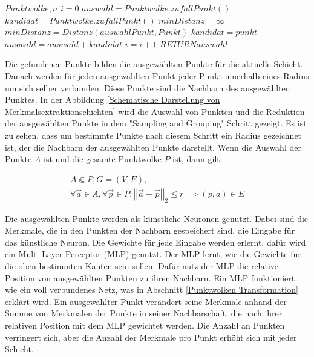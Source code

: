 \begin{algorithm}[t]
    \centering
    \caption[Farthest Point Sampling Algorithmus]{Farthest Point Sampling Algorithmus} \label{alg:Farthest Point Sampling}
    \begin{algorithmic}
    \REQUIRE $Punktwolke,n$
    \STATE $i = 0$
    \STATE $auswahl = Punktwolke.zufallPunkt()$
        \STATE $kandidat = Punktwolke.zufallPunkt()$
            \STATE $minDistanz = \infty$
                    \STATE $minDistanz = Distanz(auswahlPunkt,Punkt)$
                \ENDIF
            \ENDFOR
            \STATE $kandidat = punkt$
            \ENDIF
        \ENDFOR
        \STATE $auswahl = auswahl + kandidat$
        \STATE $i = i + 1$
    \ENDWHILE
    \STATE $RETURN auswahl$
    \end{algorithmic}
\end{algorithm}

Die gefundenen Punkte bilden die ausgewählten Punkte für die aktuelle Schicht. Danach werden für jeden ausgewählten Punkt jeder Punkt innerhalb eines Radius um sich selber verbunden. Diese Punkte sind die Nachbarn des ausgewählten Punktes.
In der Abbildung \ref{Schematische Darstellung von Merkmalsextraktionschichten} wird die Auswahl von Punkten und die Reduktion der ausgewählten Punkte in dem "Sampling and Grouping" Schritt gezeigt. Es ist zu sehen, 
dass um bestimmte Punkte nach diesem Schritt ein Radius gezeichnet ist, der die Nachbarn der ausgewählten Punkte darstellt.
Wenn die Auswahl der Punkte $A$ ist und die gesamte Punktwolke $P$ ist, dann gilt:

\begin{align}
    A \Subset P, G = (V,E), \\
    \forall \vec{a} \in A , \forall \vec{p} \in P: \left|  \left| \vec{a} - \vec{p}  \right| \right|_{2} \leq r \implies (p,a) \in E
\end{align}

Die ausgewählten Punkte werden als künstliche Neuronen genutzt. Dabei sind die Merkmale, die in den Punkten der Nachbarn gespeichert sind, die Eingabe für das künstliche Neuron. Die Gewichte für jede Eingabe werden erlernt, dafür wird ein Multi Layer Perceptor (MLP) genutzt.
Der MLP lernt, wie die Gewichte für die oben bestimmten Kanten sein sollen. Dafür nutz der MLP die relative Position von ausgewählten Punkten zu ihren Nachbarn. Ein MLP funktioniert wie ein voll verbundenes Netz, was in Abschnitt \ref{Punktwolken Transformation} erklärt wird.
Ein ausgewählter Punkt verändert seine Merkmale anhand der Summe von Merkmalen der Punkte in seiner Nachbarschaft, die nach ihrer relativen Position mit dem MLP gewichtet werden. Die Anzahl an Punkten verringert sich, aber die Anzahl der Merkmale pro Punkt erhöht sich mit jeder Schicht.


